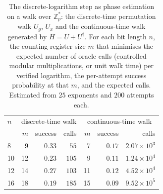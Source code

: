 \begin{table}[htbp]
\centering
\small
\caption[Walk formulations of the discrete-logarithm step]{The discrete-logarithm step as phase estimation on a walk over $\mathbb{Z}_p^*$: the discrete-time permutation walk $U_g$, $U_x$ and the continuous-time walk generated by $H = U + U^\dagger$. For each bit length $n$, the counting-register size $m$ that minimises the expected number of oracle calls (controlled modular multiplications, or unit walk time) per verified logarithm, the per-attempt success probability at that $m$, and the expected calls. Estimated from $25$ exponents and $200$ attempts each.}
\label{tab:dlpwalk}
\begin{tabular}{lrrrrrr}
\hline
$n$ & \multicolumn{3}{c}{discrete-time walk} & \multicolumn{3}{c}{continuous-time walk} \\
 & $m$ & success & calls & $m$ & success & calls \\
\hline
8 & 9 & $0.33$ & $55$ & 7 & $0.17$ & $2.07 \times 10^{3}$ \\
10 & 12 & $0.23$ & $105$ & 9 & $0.11$ & $1.24 \times 10^{4}$ \\
12 & 14 & $0.27$ & $103$ & 11 & $0.12$ & $4.52 \times 10^{4}$ \\
16 & 18 & $0.19$ & $185$ & 15 & $0.09$ & $9.52 \times 10^{5}$ \\
\hline
\end{tabular}
\end{table}
